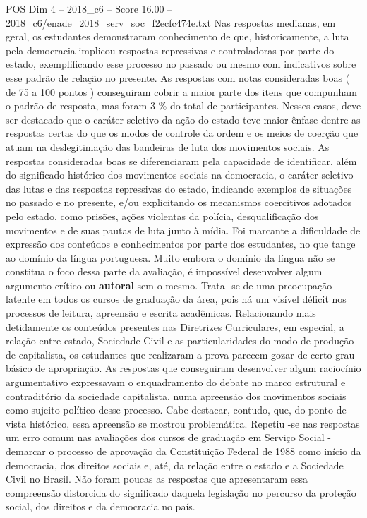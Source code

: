 \begin{textsample}{POS Dim 4 – 2018\_c6 – Score 16.00 – 2018\_c6/enade\_2018\_serv\_soc\_f2ecfc474e.txt}
Nas respostas medianas, em geral, os estudantes demonstraram conhecimento de que, historicamente, a luta pela democracia implicou respostas repressivas e controladoras por parte do estado, exemplificando esse processo no passado ou mesmo com indicativos sobre esse padrão de relação no presente.
As respostas com notas consideradas boas ( de 75 a 100 pontos ) conseguiram cobrir a maior parte dos itens que compunham o padrão de resposta, mas foram 3 \% do total de participantes.
Nesses casos, deve ser destacado que o caráter seletivo da ação do estado teve maior ênfase dentre as respostas certas do que os modos de controle da ordem e os meios de coerção que atuam na deslegitimação das bandeiras de luta dos movimentos sociais.
As respostas consideradas boas se diferenciaram pela capacidade de identificar, além do significado histórico dos movimentos sociais na democracia, o caráter seletivo das lutas e das respostas repressivas do estado, indicando exemplos de situações no passado e no presente, e/ou explicitando os mecanismos coercitivos adotados pelo estado, como prisões, ações violentas da polícia, desqualificação dos movimentos e de suas pautas de luta junto à mídia.
Foi marcante a dificuldade de expressão dos conteúdos e conhecimentos por parte dos estudantes, no que tange ao domínio da língua portuguesa.
Muito embora o domínio da língua não se constitua o foco dessa parte da avaliação, é impossível desenvolver algum argumento crítico ou \textbf{autoral} sem o mesmo.
Trata -se de uma preocupação latente em todos os cursos de graduação da área, pois há um visível déficit nos processos de leitura, apreensão e escrita acadêmicas.
Relacionando mais detidamente os conteúdos presentes nas Diretrizes Curriculares, em especial, a relação entre estado, Sociedade Civil e as particularidades do modo de produção de capitalista, os estudantes que realizaram a prova parecem gozar de certo grau básico de apropriação.
As respostas que conseguiram desenvolver algum raciocínio argumentativo expressavam o enquadramento do debate no marco estrutural e contraditório da sociedade capitalista, numa apreensão dos movimentos sociais como sujeito político desse processo.
Cabe destacar, contudo, que, do ponto de vista histórico, essa apreensão se mostrou problemática.
Repetiu -se nas respostas um erro comum nas avaliações dos cursos de graduação em Serviço Social - demarcar o processo de aprovação da Constituição Federal de 1988 como início da democracia, dos direitos sociais e, até, da relação entre o estado e a Sociedade Civil no Brasil.
Não foram poucas as respostas que apresentaram essa compreensão distorcida do significado daquela legislação no percurso da proteção social, dos direitos e da democracia no país.

\end{textsample}
